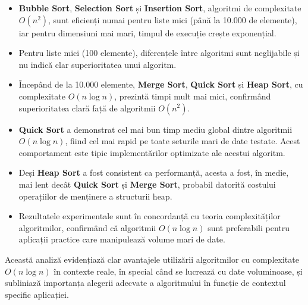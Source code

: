 \documentclass{article}
\begin{document}
\begin{itemize}
\item \textbf{Bubble Sort}, \textbf{Selection Sort} și \textbf{Insertion Sort}, algoritmi de complexitate $O(n^2)$, sunt eficienți numai pentru liste mici (până la 10.000 de elemente), iar pentru dimensiuni mai mari, timpul de execuție crește exponențial.
\item Pentru liste mici (100 elemente), diferențele între algoritmi sunt neglijabile și nu indică clar superioritatea unui algoritm.

\item Începând de la 10.000 elemente, \textbf{Merge Sort}, \textbf{Quick Sort} și \textbf{Heap Sort}, cu complexitate $O(n \log n)$, prezintă timpi mult mai mici, confirmând superioritatea clară față de algoritmii $O(n^2)$.

\item \textbf{Quick Sort} a demonstrat cel mai bun timp mediu global dintre algoritmii $O(n \log n)$, fiind cel mai rapid pe toate seturile mari de date testate. Acest comportament este tipic implementărilor optimizate ale acestui algoritm.

\item Deși \textbf{Heap Sort} a fost consistent ca performanță, acesta a fost, în medie, mai lent decât \textbf{Quick Sort} și \textbf{Merge Sort}, probabil datorită costului operațiilor de menținere a structurii heap.

\item Rezultatele experimentale sunt în concordanță cu teoria complexităților algoritmilor, confirmând că algoritmii $O(n \log n)$ sunt preferabili pentru aplicații practice care manipulează volume mari de date.
\end{itemize}

Această analiză evidențiază clar avantajele utilizării algoritmilor cu complexitate $O(n \log n)$ în contexte reale, în special când se lucrează cu date voluminoase, și subliniază importanța alegerii adecvate a algoritmului în funcție de contextul specific aplicației.



\end{document}
